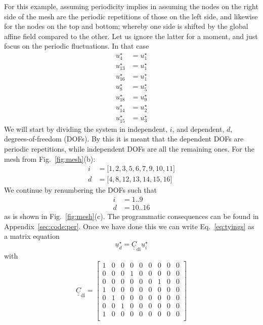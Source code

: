 \documentclass[times,namecite]{goose-article}
\begin{document}
For this example, assuming periodicity implies in assuming the nodes on the right side of the mesh are the periodic repetitions of those on the left side, and likewise for the nodes on the top and bottom; whereby one side is shifted by the global affine field compared to the other. Let us ignore the latter for a moment, and just focus on the periodic fluctuations. In that case
\begin{equation}
\begin{aligned}
  u^\star_{ 4} &= u^\star_{ 1} \\
  u^\star_{13} &= u^\star_{ 1} \\
  u^\star_{16} &= u^\star_{ 1} \\
  u^\star_{ 8} &= u^\star_{ 5} \\
  u^\star_{18} &= u^\star_{ 9} \\
  u^\star_{14} &= u^\star_{ 2} \\
  u^\star_{15} &= u^\star_{ 3}
  \label{eq:tyings}
\end{aligned}
\end{equation}
We will start by dividing the system in independent, $i$, and dependent, $d$, degrees-of-freedom (DOFs). By this it is meant that the dependent DOFs are periodic repetitions, while independent DOFs are all the remaining ones. For the mesh from Fig.~\ref{fig:mesh}(b):
\begin{align}
  i &= \big[ 1, 2, 3, 5, 6, 7, 9, 10, 11 \big] \\
  d &= \big[ 4, 8, 12, 13, 14, 15, 16 \big]
\end{align}
We continue by renumbering the DOFs such that
\begin{align}
  i &= 1 .. 9 \\
  d &= 10 .. 16
\end{align}
as is shown in Fig.~\ref{fig:mesh}(c). The programmatic consequences can be found in Appendix~\ref{sec:code:per}. Once we have done this we can write Eq.~\eqref{eq:tyings} as a matrix equation
\begin{equation}
  \underline{u}^\star_{d} = \underline{\underline{C}}_\mathrm{di} \underline{u}^\star_{i}
\end{equation}
with
\begin{equation}
  \underline{\underline{C}}_\mathrm{di} =
  \left[
  \begin{array}{ccccccccc}
    1 & 0 & 0 & 0 & 0 & 0 & 0 & 0 & 0 \\
    0 & 0 & 0 & 1 & 0 & 0 & 0 & 0 & 0 \\
    0 & 0 & 0 & 0 & 0 & 0 & 1 & 0 & 0 \\
    1 & 0 & 0 & 0 & 0 & 0 & 0 & 0 & 0 \\
    0 & 1 & 0 & 0 & 0 & 0 & 0 & 0 & 0 \\
    0 & 0 & 1 & 0 & 0 & 0 & 0 & 0 & 0 \\
    1 & 0 & 0 & 0 & 0 & 0 & 0 & 0 & 0 \\
  \end{array}
  \right]
\end{equation}
\end{document}
